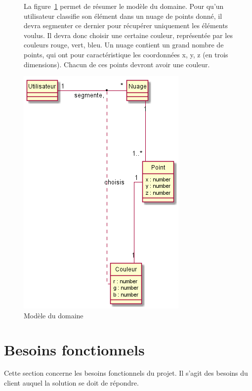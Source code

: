 \documentclass[12pt,titlepage,french]{article}
\begin{document}
\begin{figure} [!hbtp]
\begin{minipage}[c]{0.60\linewidth}
La figure~\ref{Modèle du domaine} permet de résumer le modèle du domaine. Pour qu'un utilisateur classifie son élément dans un nuage de points donné, il devra segmenter ce dernier pour récupérer uniquement les éléments voulus. Il devra donc choisir une certaine couleur, représentée par les couleurs rouge, vert, bleu. Un nuage contient un grand nombre de points, qui ont pour caractéristique les coordonnées x, y, z (en trois dimensions). Chacun de ces points devront avoir une couleur.
\end{minipage} \hfill
\begin{minipage}[c]{0.40\linewidth}
    \centering
    \caption{Modèle du domaine}
    \label{Modèle du domaine}
    \includegraphics[scale=0.60]{img_diagrammes/modele_domaine.png}
    \end{minipage}
\end{figure}

\break
\section{Besoins fonctionnels}

Cette section concerne les besoins fonctionnels du projet.
Il s'agit des besoins du client auquel la solution se doit de répondre.
\end{document}
